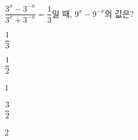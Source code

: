 $\dfrac{3^x-3^{-x}}{3^x+3^{-x}}=\dfrac{1}{3}$일 때, $9^x-9^{-x}$의 값은?
\begin{choices32}{\rule[-3ex]{0pt}{8ex}$\dfrac{1}{3}$}{\rule[-3ex]{0pt}{8ex}$\dfrac{1}{2}$}{\rule[-3ex]{0pt}{8ex}$1$}{\rule[-3ex]{0pt}{8ex}$\dfrac{3}{2}$}{\rule[-3ex]{0pt}{8ex}$2$}\end{choices32}
